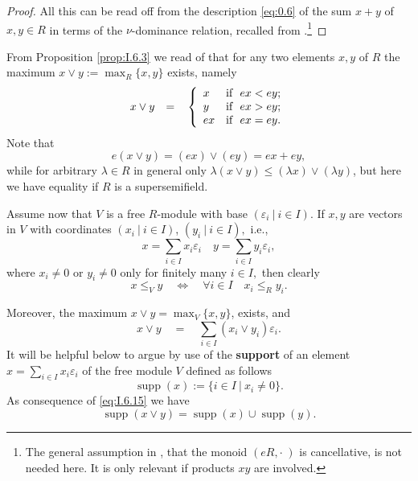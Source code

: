 \documentclass [12pt,a4paper,reqno]{amsart}
\begin{document}
\begin{proof}
All this can be read off from the description \eqref{eq:0.6} of the sum $x+y$ of $x,y\in R$ in terms of the $\nu$-dominance relation, recalled from \cite[\S2]{IzhakianRowen2007SuperTropical}.\footnote{The general assumption in \cite{IzhakianRowen2007SuperTropical}, that the monoid $(eR,\cdot \; )$ is cancellative, is not needed here. It is only relevant if products $xy$ are involved.}
\end{proof}

From Proposition  \ref{prop:I.6.3} we read of that for any two elements $x,y$ of $R$ the maximum $x \vee y:= \max_R\{ x,y\} $ exists, namely
\begin{equation}\label{eq:I.6.13}
x \vee y{\quad {=} \quad } \left\{
                  \begin{array}{ll}
                    x & \hbox{if \ } ex < ey; \\
                    y & \hbox{if \ } ex > ey;\\
                    ex & \hbox{if \ } ex =  ey.
                  \end{array}
                \right.
\end{equation}
Note that
\begin{equation}\label{eq:I.6.13}
e(x \vee y) = (ex)\vee (ey) = ex + ey,
\end{equation}
while  for arbitrary ${\lambda} \in R$ in general only
${\lambda}(x \vee y) \leq ({\lambda} x)\vee ({\lambda} y)$, but here we have equality if $R$
 is a supersemifield.

Assume now that $V$ is a free $R$-module with base $({\varepsilon}_i {\ {|} \ }i\in I).$ If $x,y$ are vectors in $V$ with coordinates $(x_i{\ {|} \ }i\in I)$, $(y_i {\ {|} \ }i\in I),$ i.e.,
$$x=\sum_{i\in I}x_i{\varepsilon}_i\quad y=\sum_{i\in I}y_i{\varepsilon}_i,$$
where $x_i\ne0$ or $y_i\ne0$ only for finitely many $i\in I, $ then clearly
\begin{equation}\label{eq:I.6.14}
x\le_Vy {\quad {\Leftrightarrow} \quad } \forall i\in I\quad x_i\le_Ry_i.\end{equation}

Moreover, the maximum $x \vee y = \max_V\{x,y\}$, exists, and
\begin{equation}\label{eq:I.6.15}
x\vee y {\quad {=} \quad }  \sum _{i \in I} (x_i \vee y_i){\varepsilon}_i.\end{equation}
It will be helpful below to argue by use of the \textbf{support} of an element
$x = \sum_{i\in I} x_i{\varepsilon}_i$ of the free module $V$ defined as follows
\begin{equation}\label{eq:I.6.16}
{\operatorname{supp}}(x) := \{  i \in I {\ {|} \ } x_i \neq 0\}.    \end{equation}
As consequence of \eqref{eq:I.6.15} we have
\begin{equation}\label{eq:I.6.17}
{\operatorname{supp}}(x \vee y) ={\operatorname{supp}}(x) \cup {\operatorname{supp}}(y).    \end{equation}
\end{document}
